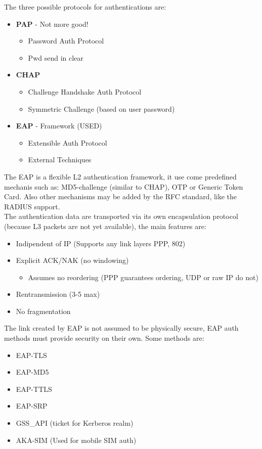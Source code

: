 \documentclass[12pt]{article}
\begin{document}
The three possible protocols for authentications are:
\begin{itemize}
  \item \textbf{PAP} - Not more good!
  \begin{itemize}
    \item Password Auth Protocol
    \item Pwd send in clear
  \end{itemize}
  \item \textbf{CHAP}
  \begin{itemize}
    \item Challenge Handshake Auth Protocol
    \item Symmetric Challenge (based on user password)
  \end{itemize}
  \item \textbf{EAP} - Framework (USED)
  \begin{itemize}
    \item Extensible Auth Protocol
    \item External Techniques
  \end{itemize}
\end{itemize}
The EAP is a flexible L2 authentication framework, it use come predefined mechanis such as: MD5-challenge (similar to CHAP), OTP or Generic Token Card. Also other mechanisms may be added by the RFC standard, like the RADIUS support.\\
The authentication data are transported via its own encapsulation protocol (because L3 packets are not yet available), the main features are:
\begin{itemize}
  \item Indipendent of IP (Supports any link layers PPP, 802)
  \item Explicit ACK/NAK (no windowing)
  \begin{itemize}
    \item Assumes no reordering (PPP guarantees ordering, UDP or raw IP do not)
  \end{itemize}
  \item Rentransmission (3-5 max)
  \item No fragmentation
\end{itemize}
The link created by EAP is not assumed to be physically secure, EAP auth methods must provide security on their own. Some methods are:
\begin{itemize}
  \item EAP-TLS
  \item EAP-MD5
  \item EAP-TTLS
  \item EAP-SRP
  \item GSS\_API (ticket for Kerberos realm)
  \item AKA-SIM (Used for mobile SIM auth)
\end{itemize}
\end{document}
